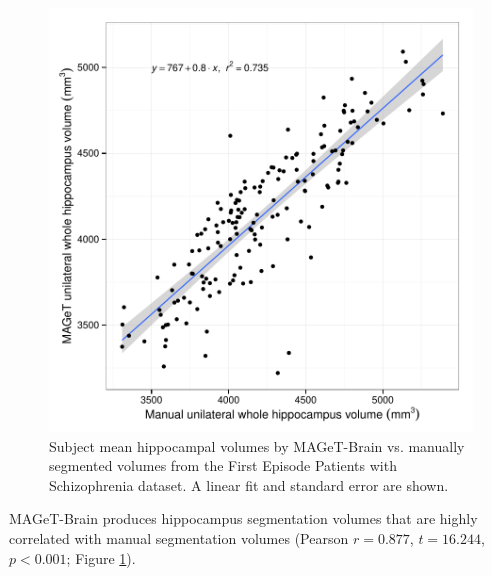 \documentclass{article}\usepackage{graphicx, color}
\makeatletter
\def\maxwidth{ %
  \ifdim\Gin@nat@width>\linewidth
    \linewidth
  \else
    \Gin@nat@width
  \fi
}
\newenvironment{knitrout}{}{} %
\newcommand{\mb}{MAGeT-Brain }
\makeatother
\begin{document}
\begin{figure}
\begin{knitrout}
\color{fgcolor}

{\centering \includegraphics[width=\maxwidth]{figure/FEP-volumes} 

}



\end{knitrout}

  \caption{Subject mean hippocampal volumes by \mb vs. manually segmented
   volumes from the First Episode Patients with Schizophrenia dataset. A linear fit
   and standard error are shown.}
  \label{fig:SZ-volumes}
\end{figure}



\mb produces hippocampus segmentation volumes that are highly correlated with 
manual segmentation volumes (Pearson $r = 0.877$, 
$t = 16.244$, $p < 0.001$; Figure \ref{fig:SZ-volumes}). 


\FloatBarrier
\end{document}
